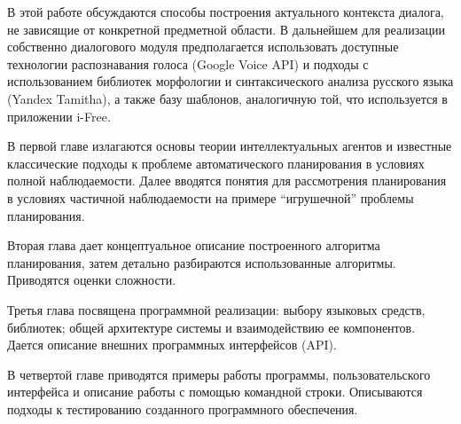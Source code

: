 В этой работе обсуждаются способы построения актуального контекста диалога, не зависящие от конкретной предметной области. В дальнейшем для реализации собственно диалогового модуля предполагается использовать доступные технологии распознавания голоса (Google Voice API) и подходы с использованием библиотек морфологии и синтаксического анализа русского языка (Yandex Tamitha), а также базу шаблонов, аналогичную той, что используется в приложении i-Free.

В первой главе излагаются основы теории интеллектуальных агентов и известные классические подходы к проблеме автоматического планирования в условиях полной наблюдаемости. Далее вводятся понятия для рассмотрения планирования в условиях частичной наблюдаемости на примере ``игрушечной'' проблемы планирования.

Вторая глава дает концептуальное описание построенного алгоритма планирования, затем детально разбираются использованные алгоритмы. Приводятся оценки сложности.

Третья глава посвящена программной реализации: выбору языковых средств, библиотек; общей архитектуре системы и взаимодействию ее компонентов. Дается описание внешних программных интерфейсов (API).

В четвертой главе приводятся примеры работы программы, пользовательского интерфейса и описание работы с помощью командной строки. Описываются подходы к тестированию созданного программного обеспечения.